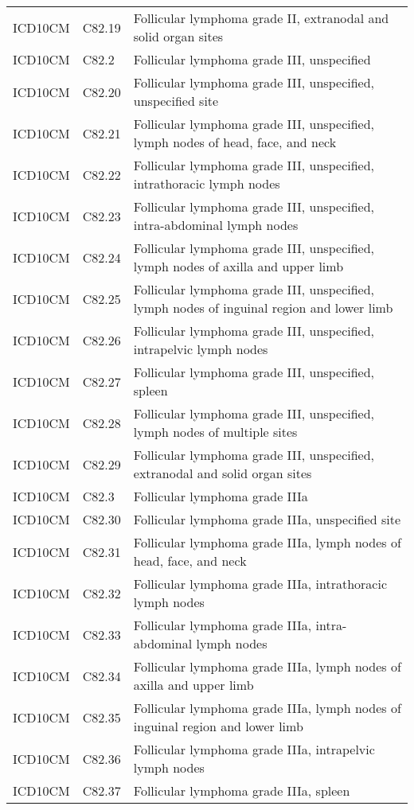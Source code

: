 \begin{longtable}{p{}p{}p{}}
  ICD10CM & C82.19 & Follicular lymphoma grade II, extranodal and solid organ sites \\ 
  ICD10CM & C82.2 & Follicular lymphoma grade III, unspecified \\ 
  ICD10CM & C82.20 & Follicular lymphoma grade III, unspecified, unspecified site \\ 
  ICD10CM & C82.21 & Follicular lymphoma grade III, unspecified, lymph nodes of head, face, and neck \\ 
  ICD10CM & C82.22 & Follicular lymphoma grade III, unspecified, intrathoracic lymph nodes \\ 
  ICD10CM & C82.23 & Follicular lymphoma grade III, unspecified, intra-abdominal lymph nodes \\ 
  ICD10CM & C82.24 & Follicular lymphoma grade III, unspecified, lymph nodes of axilla and upper limb \\ 
  ICD10CM & C82.25 & Follicular lymphoma grade III, unspecified, lymph nodes of inguinal region and lower limb \\ 
  ICD10CM & C82.26 & Follicular lymphoma grade III, unspecified, intrapelvic lymph nodes \\ 
  ICD10CM & C82.27 & Follicular lymphoma grade III, unspecified, spleen \\ 
  ICD10CM & C82.28 & Follicular lymphoma grade III, unspecified, lymph nodes of multiple sites \\ 
  ICD10CM & C82.29 & Follicular lymphoma grade III, unspecified, extranodal and solid organ sites \\ 
  ICD10CM & C82.3 & Follicular lymphoma grade IIIa \\ 
  ICD10CM & C82.30 & Follicular lymphoma grade IIIa, unspecified site \\ 
  ICD10CM & C82.31 & Follicular lymphoma grade IIIa, lymph nodes of head, face, and neck \\ 
  ICD10CM & C82.32 & Follicular lymphoma grade IIIa, intrathoracic lymph nodes \\ 
  ICD10CM & C82.33 & Follicular lymphoma grade IIIa, intra-abdominal lymph nodes \\ 
  ICD10CM & C82.34 & Follicular lymphoma grade IIIa, lymph nodes of axilla and upper limb \\ 
  ICD10CM & C82.35 & Follicular lymphoma grade IIIa, lymph nodes of inguinal region and lower limb \\ 
  ICD10CM & C82.36 & Follicular lymphoma grade IIIa, intrapelvic lymph nodes \\ 
  ICD10CM & C82.37 & Follicular lymphoma grade IIIa, spleen \\ 

\end{longtable}
